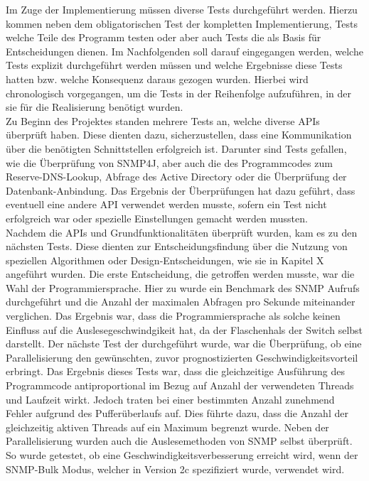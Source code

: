 Im Zuge der Implementierung müssen diverse Tests durchgeführt werden. Hierzu kommen neben dem obligatorischen Test der kompletten Implementierung, Tests welche Teile des Programm testen oder aber auch Tests die als Basis für Entscheidungen dienen.
Im Nachfolgenden soll darauf eingegangen werden, welche Tests explizit durchgeführt werden müssen und welche Ergebnisse diese Tests hatten bzw. welche Konsequenz daraus gezogen wurden. Hierbei wird chronologisch vorgegangen, um die Tests in der Reihenfolge aufzuführen, in der sie für die Realisierung benötigt wurden.\\
Zu Beginn des Projektes standen mehrere Tests an, welche diverse APIs überprüft haben. Diese dienten dazu, sicherzustellen, dass eine Kommunikation über die benötigten Schnittstellen erfolgreich ist. Darunter sind Tests gefallen, wie die Überprüfung von SNMP4J, aber auch die des Programmcodes zum Reserve-DNS-Lookup, Abfrage des Active Directory oder die  Überprüfung der Datenbank-Anbindung. Das Ergebnis der Überprüfungen hat dazu geführt, dass eventuell eine andere API verwendet werden musste, sofern ein Test nicht erfolgreich war oder spezielle Einstellungen gemacht werden mussten.\\
Nachdem die APIs und Grundfunktionalitäten überprüft wurden, kam es zu den nächsten Tests. Diese dienten zur Entscheidungsfindung über die Nutzung von speziellen Algorithmen oder Design-Entscheidungen, wie sie in Kapitel X angeführt wurden.
Die erste Entscheidung, die getroffen werden musste, war die Wahl der Programmiersprache. Hier zu wurde ein Benchmark des SNMP Aufrufs durchgeführt und die Anzahl der maximalen  Abfragen pro Sekunde miteinander verglichen. Das Ergebnis war, dass die Programmiersprache als solche keinen Einfluss auf die Auslesegeschwindgikeit hat, da der Flaschenhals der Switch selbst darstellt. Der nächste Test der durchgeführt wurde, war die Überprüfung, ob eine Parallelisierung den gewünschten, zuvor prognostizierten Geschwindigkeitsvorteil erbringt. Das Ergebnis dieses Tests war, dass die gleichzeitige Ausführung des Programmcode antiproportional im Bezug auf Anzahl der verwendeten Threads und Laufzeit wirkt. Jedoch traten bei einer bestimmten Anzahl zunehmend Fehler aufgrund des Pufferüberlaufs auf. Dies führte dazu, dass die Anzahl der gleichzeitig aktiven Threads auf ein Maximum begrenzt wurde. Neben der Parallelisierung wurden auch die Auslesemethoden von SNMP selbst überprüft. So wurde getestet, ob eine Geschwindigkeitsverbesserung erreicht wird, wenn der SNMP-Bulk Modus, welcher in Version 2c spezifiziert wurde, verwendet wird.

